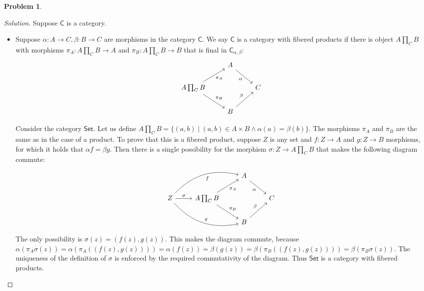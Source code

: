 \documentclass{article}
\theoremstyle{definition}
\newtheorem{problem-internal}{Problem}[subsection]
\newenvironment{problem}{
	\medskip
	\begin{problem-internal}
	}{
\end{problem-internal}
}
\newenvironment{solution}{
	\begin{proof}[Solution]
		\vspace{-8px}
		\setlength{\parskip}{4px}
		\setlength{\parindent}{0px}
	}{
\end{proof}
}
\newcommand{\C}{\mathsf{C}}
\newcommand{\Cset}{\mathsf{Set}}
\begin{document}
\begin{problem}
\end{problem}

\begin{solution}
	Suppose $\C$ is a category.
	\begin{itemize}
		\item Suppose $\alpha: A \to C, \beta: B \to C$ are morphisms in the category $\C$. We say $\C$ is a category with fibered products if there is object $A \prod_C B$ with morphisms $\pi_A : A \prod_C B \to A$ and $\pi_B: A \prod_C B \to B$ that is final in $\C_{\alpha,\beta}$:
		\begin{equation*}
			\begin{tikzcd}
				& A \arrow[dr, "\alpha" swap] &\\
				A \prod_C B
					\arrow[ur, "\pi_A" swap]
					\arrow[dr, "\pi_B"]
					& & C\\
				& B \arrow[ur, "\beta"] &
			\end{tikzcd}
		\end{equation*}
		
		Consider the category $\Cset$. Let us define $A \prod_C B = \{(a, b) \mid (a,b) \in A \times B \wedge \alpha(a) = \beta(b)\}$. The morphisms $\pi_A$ and $\pi_B$ are the same as in the case of a product. To prove that this is a fibered product, suppose $Z$ is any set and $f: Z \to A$ and $g: Z \to B$ morphisms, for which it holds that $\alpha f = \beta g$. Then there is a single possibility for the morphism $\sigma: Z \to A \prod_C B$ that makes the following diagram commute:
		\begin{equation*}
			\begin{tikzcd}
				& & A \arrow[dr, "\alpha" swap] &\\
				Z
					\arrow[r, "\sigma"]
					\arrow[urr, bend left, "f" swap]
					\arrow[drr, bend right, "g"]
					& A \prod_C B
						\arrow[ur, "\pi_A" swap]
						\arrow[dr, "\pi_B"]
					& & C\\
				& & B \arrow[ur, "\beta"] &
			\end{tikzcd}
		\end{equation*}
		The only possibility is $\sigma(z) = (f(z),g(z))$. This makes the diagram commute, because $\alpha(\pi_A\sigma(z))=\alpha(\pi_A((f(z),g(z))))=\alpha(f(z))=\beta(g(z))=\beta(\pi_B((f(z), g(z))))=\beta(\pi_B\sigma(z))$. The uniqueness of the definition of $\sigma$ is enforced by the required commutativity of the diagram. Thus $\Cset$ is a category with fibered products.
		

\end{itemize}
\end{solution}
\end{document}
